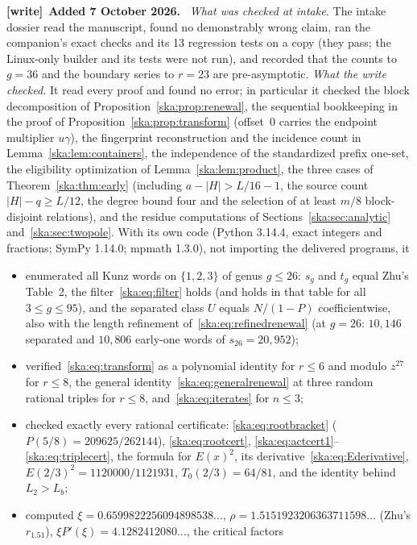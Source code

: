 \documentclass[11pt,letterpaper]{article}
\theoremstyle{definition}
\newenvironment{writenote}[1][]{\par\smallskip\begingroup\small
 \noindent\textbf{[write]}\if\relax\detokenize{#1}\relax\else~\textbf{#1.}\fi\ }%
 {\par\endgroup\smallskip}
\begin{document}
\begin{writenote}[Added 7 October 2026]
\emph{What was checked at intake.} The intake dossier read the manuscript,
found no demonstrably wrong claim, ran the companion's exact checks and its
13 regression tests on a copy (they pass; the Linux-only builder and its
tests were not run), and recorded that the counts to $g=36$ and the boundary
series to $r=23$ are pre-asymptotic. \emph{What the write checked.} It read
every proof and found no error; in particular it checked the block
decomposition of Proposition~\ref{ska:prop:renewal}, the sequential bookkeeping
in the proof of Proposition~\ref{ska:prop:transform} (offset~$0$ carries the
endpoint multiplier $u\gamma$), the fingerprint reconstruction and the
incidence count in Lemma~\ref{ska:lem:containers}, the independence of the
standardized prefix one-set, the eligibility optimization of
Lemma~\ref{ska:lem:product}, the three cases of
Theorem~\ref{ska:thm:early} (including $a-|H|>L/16-1$, the source count
$|H|-q\ge L/12$, the degree bound four and the selection of at least $m/8$
block-disjoint relations), and the residue computations of
Sections~\ref{ska:sec:analytic} and~\ref{ska:sec:twopole}. With its own code
(Python 3.14.4, exact integers and fractions; SymPy 1.14.0; mpmath 1.3.0), not
importing the delivered programs, it
\begin{itemize}\raggedright
\item enumerated all Kunz words on $\{1,2,3\}$ of genus $g\le26$: $s_g$ and
$t_g$ equal Zhu's Table~2, the filter~\eqref{ska:eq:filter} holds (and holds
in that table for all $3\le g\le95$), and the separated class $U$ equals
$N/(1-P)$ coefficientwise, also with the length refinement
of~\eqref{ska:eq:refinedrenewal} (at $g=26$: $10{,}146$ separated and
$10{,}806$ early-one words of $s_{26}=20{,}952$);
\item verified~\eqref{ska:eq:transform} as a polynomial identity for $r\le6$
and modulo $z^{27}$ for $r\le8$, the general identity~\eqref{ska:eq:generalrenewal}
at three random rational triples for $r\le8$, and~\eqref{ska:eq:iterates} for
$n\le3$;
\item checked exactly every rational certificate: \eqref{ska:eq:rootbracket}
($P(5/8)=209625/262144$), \eqref{ska:eq:rootcert},
\eqref{ska:eq:actcert1}--\eqref{ska:eq:triplecert}, the formula for $E(x)^2$,
its derivative~\eqref{ska:eq:Ederivative}, $E(2/3)^2=1120000/1121931$,
$T_0(2/3)=64/81$, and the identity behind $L_2>L_b$;
\item computed $\xi=0.6599822256094898538\ldots$, $\rho=1.5151923206363711598\ldots$
(Zhu's $r_{1.51}$), $\xi P'(\xi)=4.1282412080\ldots$, the critical factors

\end{itemize}
\end{writenote}
\end{document}
